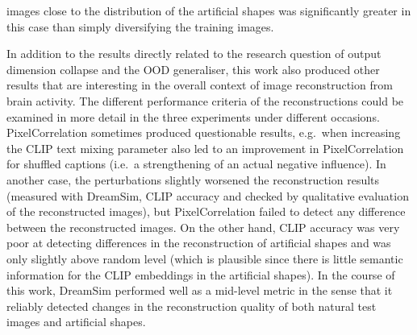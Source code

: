 images close to the distribution of the artificial shapes was significantly greater in this case than simply diversifying the training images.

In addition to the results directly related to the research question of output dimension collapse and the OOD generaliser, this work also produced other results that are interesting in the overall context of image reconstruction from brain activity. The different performance criteria of the reconstructions could be examined in more detail in the three experiments under different occasions. PixelCorrelation sometimes produced questionable results, e.g.\ when increasing the CLIP text mixing parameter also led to an improvement in PixelCorrelation for shuffled captions (i.e.\ a strengthening of an actual negative influence). In another case, the perturbations slightly worsened the reconstruction results (measured with DreamSim, CLIP accuracy and checked by qualitative evaluation of the reconstructed images), but PixelCorrelation failed to detect any difference between the reconstructed images. On the other hand, CLIP accuracy was very poor at detecting differences in the reconstruction of artificial shapes and was only slightly above random level (which is plausible since there is little semantic information for the CLIP embeddings in the artificial shapes). In the course of this work, DreamSim performed well as a mid-level metric in the sense that it reliably detected changes in the reconstruction quality of both natural test images and artificial shapes.

